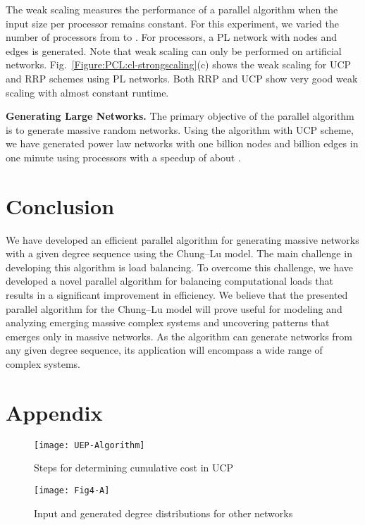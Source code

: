 \documentclass[conference,letterpaper,10pt]{IEEEtran}
\newcommand{\Figure}{Fig.\xspace}
\begin{document}
The weak scaling measures the performance of a parallel algorithm when the input size per processor remains constant. For this experiment, we varied the number of processors from  to . For  processors, a PL network with  nodes and  edges is generated. Note that weak scaling can only be performed on artificial networks. \Figure~\ref{Figure:PCL:cl-strongscaling}(c) shows the weak scaling for UCP and RRP schemes using PL networks. Both RRP and UCP show very good weak scaling with almost constant runtime.

\textbf{Generating Large Networks.}
The primary objective of the parallel algorithm is to generate massive random networks. Using the algorithm with UCP scheme,  we have generated power law networks with one billion nodes and  billion edges in one minute using  processors with a speedup of about .

\section{Conclusion}
\label{Section:PCL:conclusion}
We have developed an efficient parallel algorithm for generating massive networks with a given degree sequence using the Chung--Lu model. The main challenge in developing this algorithm is load balancing. To overcome this challenge, we have developed a novel parallel algorithm for balancing computational loads that results in a significant improvement in efficiency. We believe that the presented parallel algorithm for the Chung--Lu model will prove useful for modeling and analyzing emerging massive complex systems and uncovering patterns that emerges only in massive networks. As the algorithm can generate networks from any given degree sequence, its application will encompass a wide range of complex systems.





 \section{Appendix}
 \label{Section:Appendix}
 
 \begin{figure*}[ht!]
 \centering
{\texttt{[image: UEP-Algorithm]}}
 \caption{Steps for determining cumulative cost in UCP}
 \label{Figure:PCL:uep-scheme}
 \end{figure*}
 
 \begin{figure*}[ht!]
 \centering
{\texttt{[image: Fig4-A]}}
 \caption{Input and generated degree distributions for other networks}
 \label{Figure:PCL:OtherNetworks}
 \end{figure*}
 
\end{document}

